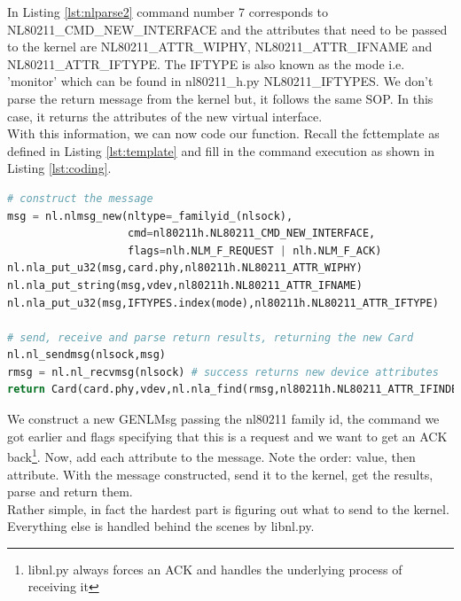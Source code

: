 \documentclass[11pt]{article}
\begin{document}
In Listing \ref{lst:nlparse2} command number 7 corresponds to 
NL80211\_CMD\_NEW\_INTERFACE and the attributes that need to be passed to the
kernel are NL80211\_ATTR\_WIPHY, NL80211\_ATTR\_IFNAME and NL80211\_ATTR\_IFTYPE.
The IFTYPE is also known as the mode i.e. 'monitor' which can be found in
nl80211\_h.py NL80211\_IFTYPES. We don't parse the return message from the kernel
but, it follows the same SOP. In this case, it returns the attributes of the new
virtual interface. \\

With this information, we can now code our function. Recall the fcttemplate as
defined in Listing \ref{lst:template} and fill in the command execution as shown 
in Listing \ref{lst:coding}. \\

\begin{lstlisting}[caption={Coding the function},
                   label={lst:coding},
                   language=Python]
# construct the message
msg = nl.nlmsg_new(nltype=_familyid_(nlsock),
                   cmd=nl80211h.NL80211_CMD_NEW_INTERFACE,
                   flags=nlh.NLM_F_REQUEST | nlh.NLM_F_ACK)
nl.nla_put_u32(msg,card.phy,nl80211h.NL80211_ATTR_WIPHY)
nl.nla_put_string(msg,vdev,nl80211h.NL80211_ATTR_IFNAME)
nl.nla_put_u32(msg,IFTYPES.index(mode),nl80211h.NL80211_ATTR_IFTYPE)

# send, receive and parse return results, returning the new Card
nl.nl_sendmsg(nlsock,msg)
rmsg = nl.nl_recvmsg(nlsock) # success returns new device attributes
return Card(card.phy,vdev,nl.nla_find(rmsg,nl80211h.NL80211_ATTR_IFINDEX))
\end{lstlisting}

We construct a new GENLMsg passing the nl80211 family id, the command we got
earlier and flags specifying that this is a request and we want to get an ACK
back\footnote{libnl.py always forces an ACK and handles the underlying process 
of receiving it}. Now, add each attribute to the message. Note the order: value, 
then attribute. With the message constructed, send it to the kernel, get the 
results, parse and return them.\\

Rather simple, in fact the hardest part is figuring out what to send to the kernel.
Everything else is handled behind the scenes by libnl.py.
\end{document}

